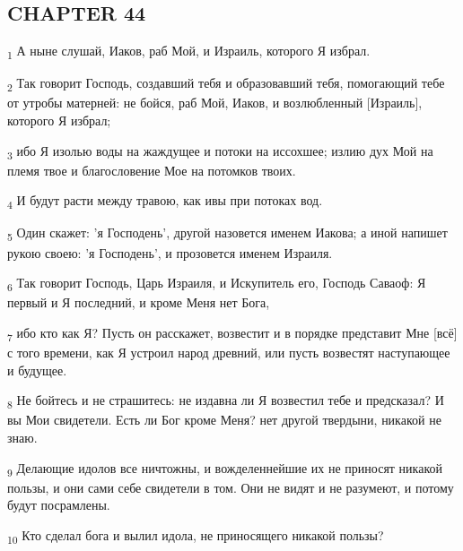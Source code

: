 \subsection{CHAPTER 44}
\begin{tcolorbox}
\textsubscript{1} А ныне слушай, Иаков, раб Мой, и Израиль, которого Я избрал.
\end{tcolorbox}
\begin{tcolorbox}
\textsubscript{2} Так говорит Господь, создавший тебя и образовавший тебя, помогающий тебе от утробы матерней: не бойся, раб Мой, Иаков, и возлюбленный [Израиль], которого Я избрал;
\end{tcolorbox}
\begin{tcolorbox}
\textsubscript{3} ибо Я изолью воды на жаждущее и потоки на иссохшее; излию дух Мой на племя твое и благословение Мое на потомков твоих.
\end{tcolorbox}
\begin{tcolorbox}
\textsubscript{4} И будут расти между травою, как ивы при потоках вод.
\end{tcolorbox}
\begin{tcolorbox}
\textsubscript{5} Один скажет: 'я Господень', другой назовется именем Иакова; а иной напишет рукою своею: 'я Господень', и прозовется именем Израиля.
\end{tcolorbox}
\begin{tcolorbox}
\textsubscript{6} Так говорит Господь, Царь Израиля, и Искупитель его, Господь Саваоф: Я первый и Я последний, и кроме Меня нет Бога,
\end{tcolorbox}
\begin{tcolorbox}
\textsubscript{7} ибо кто как Я? Пусть он расскажет, возвестит и в порядке представит Мне [всё] с того времени, как Я устроил народ древний, или пусть возвестят наступающее и будущее.
\end{tcolorbox}
\begin{tcolorbox}
\textsubscript{8} Не бойтесь и не страшитесь: не издавна ли Я возвестил тебе и предсказал? И вы Мои свидетели. Есть ли Бог кроме Меня? нет другой твердыни, никакой не знаю.
\end{tcolorbox}
\begin{tcolorbox}
\textsubscript{9} Делающие идолов все ничтожны, и вожделеннейшие их не приносят никакой пользы, и они сами себе свидетели в том. Они не видят и не разумеют, и потому будут посрамлены.
\end{tcolorbox}
\begin{tcolorbox}
\textsubscript{10} Кто сделал бога и вылил идола, не приносящего никакой пользы?
\end{tcolorbox}
